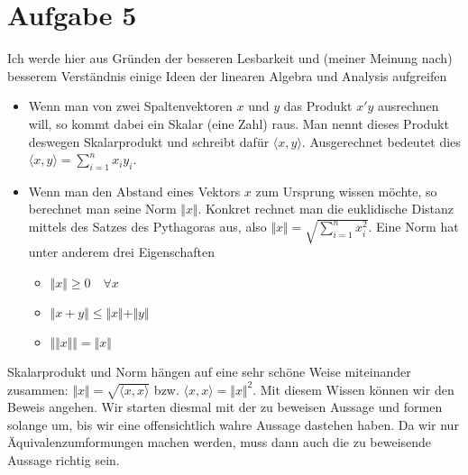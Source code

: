 \documentclass{article}
\begin{document}
	\section*{Aufgabe 5}
	Ich werde hier aus Gründen der besseren Lesbarkeit und (meiner Meinung nach) besserem Verständnis einige Ideen der linearen Algebra und Analysis aufgreifen
	\begin{itemize}
		\item Wenn man von zwei Spaltenvektoren $x$ und $y$ das Produkt $x'y$ ausrechnen will, so kommt dabei ein Skalar (eine Zahl) raus. Man nennt dieses Produkt deswegen Skalarprodukt und schreibt dafür $\langle x,y\rangle$. Ausgerechnet bedeutet dies $\langle x,y\rangle = \sum_{i=1}^{n} x_iy_i$.
		\item Wenn man den Abstand eines Vektors $x$ zum Ursprung wissen möchte, so berechnet man seine Norm $\Vert x\Vert$. Konkret rechnet man die euklidische Distanz mittels des Satzes des Pythagoras aus, also $\Vert x\Vert = \sqrt{\sum_{i=1}^n x_i^2}$. Eine Norm hat unter anderem drei Eigenschaften
		\begin{itemize}
			\item $\Vert x\Vert \ge 0 \quad\forall x$
			\item $\Vert x+y\Vert \le \Vert x\Vert + \Vert y\Vert$
			\item $\Vert\Vert x\Vert\Vert = \Vert x\Vert$
		\end{itemize}
	\end{itemize}
	Skalarprodukt und Norm hängen auf eine sehr schöne Weise miteinander zusammen: $\Vert x\Vert = \sqrt{\langle x,x\rangle}$ bzw. $\langle x,x\rangle = \Vert x\Vert^2$. Mit diesem Wissen können wir den Beweis angehen. Wir starten diesmal mit der zu beweisen Aussage und formen solange um, bis wir eine offensichtlich wahre Aussage dastehen haben. Da wir nur Äquivalenzumformungen machen werden, muss dann auch die zu beweisende Aussage richtig sein.
\end{document}

